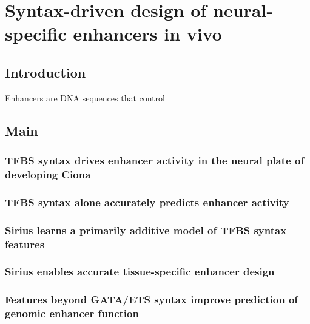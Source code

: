 \chapter{Syntax-driven design of neural-specific enhancers in vivo}
\label{chap:chapter 2}

\section{Introduction}

Enhancers are DNA sequences that control

\section{Main}

\subsection{TFBS syntax drives enhancer activity in the neural plate of developing Ciona}

\subsection{TFBS syntax alone accurately predicts enhancer activity}

\subsection{Sirius learns a primarily additive model of TFBS syntax features}

\subsection{Sirius enables accurate tissue-specific enhancer design}

\subsection{Features beyond GATA/ETS syntax improve prediction of genomic enhancer function}

